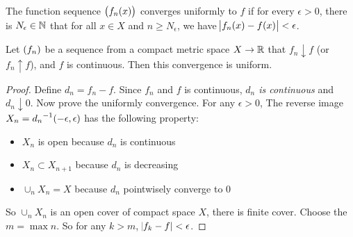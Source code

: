 \begin{definition}
    The function sequence $\sequence{f_n (x)}$ converges uniformly to $f$ if for every $\epsilon >0$, there is $N_\epsilon \in \mathbb{N}$ that for all $x \in X$ and $n \geq N_\epsilon$, we have $\abs{f_n (x) - f(x)} < \epsilon$.
\end{definition}

\begin{theorem}
    Let $\sequence{f_n}$ be a sequence from a compact metric space $X \rightarrow \mathbb{R}$ that $f_n \downarrow f$ (or $f_n \uparrow f$), and $f$ is continuous. Then this convergence is uniform.
\end{theorem}
\begin{proof}
    Define $d_n = f_n - f$. Since $f_n$ and $f$ is continuous, \emph{$d_n$ is continuous} and $d_n \downarrow 0$. Now prove the uniformly convergence. For any $\epsilon > 0$, The reverse image $X_n = {d_n}^{-1}(-\epsilon, \epsilon)$ has the following property:
    \begin{itemize}
        \item $X_n$ is open because $d_n$ is continuous
        \item $X_n \subset X_{n+1}$ because $d_n$ is decreasing
        \item $\cup_n X_n = X$ because $d_n$ pointwisely converge to $0$
    \end{itemize}
    
    So $\cup_n X_n$ is an open cover of compact space $X$, there is finite cover. Choose the $m = \max n$. So for any $k > m$, $\abs{f_k - f} < \epsilon$.
\end{proof}


